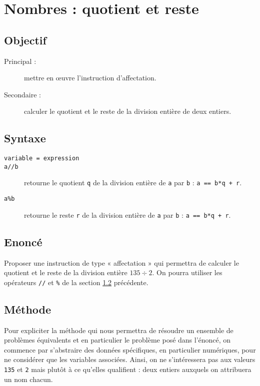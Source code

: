 \section{Nombres : quotient et reste}

\subsection{Objectif}\label{affectation:nombres:objectif}
\begin{description}
\item[Principal : ] mettre en \oe uvre l'instruction d'affectation.
\item[Secondaire :] calculer le quotient et le reste de la division entière de deux entiers.
\end{description}

\subsection{Syntaxe \python}\label{affectation:nombres:python}
\begin{description}
\item[\texttt{variable = expression}]\mbox{}
\item[\texttt{a//b}] retourne le quotient \texttt{q} de la division entière de 
	\texttt{a} par \texttt{b} : \texttt{a == b*q + r}.
\item[\texttt{a\%b}] retourne le reste \texttt{r} de la division entière de 
	\texttt{a} par \texttt{b} : \texttt{a == b*q + r}.
\end{description}

\subsection{Enoncé}\label{affectation:nombres:enonce}
Proposer une instruction de type « affectation » qui permettra de calculer le
quotient et le reste de la division entière $135\div 2$.
On pourra utiliser les opérateurs \texttt{//} et \texttt{\%} 
de la section \ref{affectation:nombres:python} précédente.

\subsection{Méthode}\label{affectation:nombres:methode}
Pour expliciter la méthode qui nous permettra de résoudre un ensemble de problèmes 
équivalents et en particulier le problème posé dans l'énoncé, on commence par s'abstraire 
des données spécifiques, en particulier numériques, pour ne considérer que les variables associées. 
Ainsi, on ne s'intéressera pas aux valeurs \texttt{135} et \texttt{2} mais
plutôt à ce qu'elles qualifient : deux entiers auxquels on attribuera un nom chacun.

